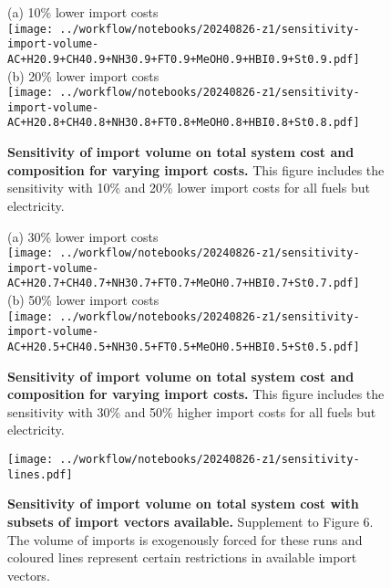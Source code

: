 \begin{figure*}
    \small
    (a) 10\% lower import costs \\
    \texttt{[image: ../workflow/notebooks/20240826-z1/sensitivity-import-volume-AC+H20.9+CH40.9+NH30.9+FT0.9+MeOH0.9+HBI0.9+St0.9.pdf]} \\
    (b) 20\% lower import costs \\
    \texttt{[image: ../workflow/notebooks/20240826-z1/sensitivity-import-volume-AC+H20.8+CH40.8+NH30.8+FT0.8+MeOH0.8+HBI0.8+St0.8.pdf]} \\
    \caption{\textbf{Sensitivity of import volume on total system cost and composition for varying import costs.} This figure includes the sensitivity with
    10\% and 20\% lower import costs for all fuels but electricity.}
    \label{fig:si:volume-lower-1}
\end{figure*}

\begin{figure*}
    \small
    (a) 30\% lower import costs \\
    \texttt{[image: ../workflow/notebooks/20240826-z1/sensitivity-import-volume-AC+H20.7+CH40.7+NH30.7+FT0.7+MeOH0.7+HBI0.7+St0.7.pdf]} \\
    (b) 50\% lower import costs \\
    \texttt{[image: ../workflow/notebooks/20240826-z1/sensitivity-import-volume-AC+H20.5+CH40.5+NH30.5+FT0.5+MeOH0.5+HBI0.5+St0.5.pdf]} \\
    \caption{\textbf{Sensitivity of import volume on total system cost and composition for varying import costs.} This figure includes the sensitivity with
    30\% and 50\% higher import costs for all fuels but electricity.}
    \label{fig:si:volume-lower-2}
\end{figure*}


\begin{figure*}
    \texttt{[image: ../workflow/notebooks/20240826-z1/sensitivity-lines.pdf]}
    \caption{\textbf{Sensitivity of import volume on total system cost with
    subsets of import vectors available.} Supplement to Figure 6. The volume of imports is exogenously
    forced for these runs and coloured lines represent certain restrictions in available import vectors.}
    \label{fig:si:volume-subsets}
\end{figure*}


